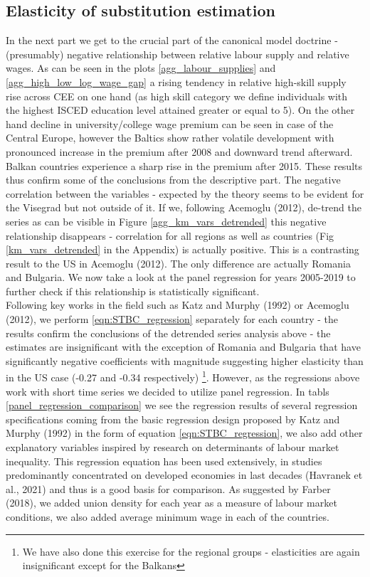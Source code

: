 \documentclass{article}
\begin{document}
\subsection{Elasticity of substitution estimation}
In the next part we get to the crucial part of the canonical model doctrine - (presumably) negative relationship between relative labour supply and relative wages. As can be seen in the plots \ref{agg_labour_supplies} and \ref{agg_high_low_log_wage_gap} a rising tendency in relative high-skill supply rise across CEE on one hand (as high skill category we define individuals with the highest ISCED education level attained greater or equal to 5). On the other hand decline in university/college wage premium can be seen in case of the Central Europe, however the Baltics show rather volatile development with pronounced increase in the premium after 2008 and downward trend afterward. Balkan countries experience a sharp rise in the premium after 2015. These results thus confirm some of the conclusions from the descriptive part. 
The negative correlation between the variables - expected by the theory seems to be evident for the Visegrad but not outside of it. If we, following Acemoglu (2012), de-trend the series as can be visible in Figure \ref{agg_km_vars_detrended} this negative relationship disappears - correlation for all regions as well as countries (Fig \ref{km_vars_detrended} in the Appendix) is actually positive. This is a contrasting result to the US in Acemoglu (2012). The only difference are actually Romania and Bulgaria.
We now take a look at the panel regression for years 2005-2019 to further check if this relationship is statistically significant.\\
Following key works in the field such as Katz and Murphy (1992) or Acemoglu (2012), we perform \ref{eqn:STBC_regression} separately for each country - the results confirm the conclusions of the detrended series analysis above - the estimates are insignificant with the exception of Romania and Bulgaria that have significantly negative coefficients with magnitude suggesting higher elasticity than in the US case (-0.27 and -0.34 respectively)  \footnote{We have also done this exercise for the regional groups - elasticities are again insignificant except for the Balkans}. %
However, as the regressions above work with short time series we decided to utilize panel regression.
In tabls \ref{panel_regression_comparison} we see the regression results of several regression specifications coming from the basic regression design proposed by Katz and Murphy (1992) in the form of equation \ref{eqn:STBC_regression}, we also add  other explanatory variables inspired by research on determinants of labour market inequality. This regression equation has been used extensively, in studies predominantly concentrated on developed economies in last decades (Havranek et al., 2021) and thus is a good basis for comparison. As suggested by Farber (2018), we added union density for each year as a measure of labour market conditions, we also added average minimum wage in each of the countries.\\
\end{document}
